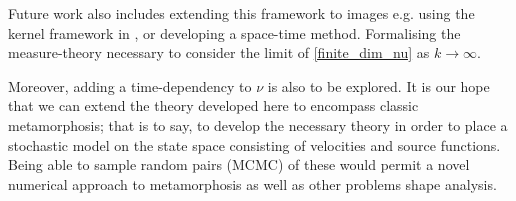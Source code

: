 \documentclass{article}
\begin{document}
Future work also includes extending this framework to images e.g. using the
kernel framework in \cite{richardson2016metamorphosis}, or developing a
space-time method. Formalising the measure-theory necessary to consider the
limit of \eqref{finite_dim_nu} as $k\rightarrow\infty$.

Moreover, adding a time-dependency to $\nu$ is also to be
explored. It is our hope that we can extend the theory developed here to
encompass classic metamorphosis; that is to say, to develop the necessary theory
in order to place a stochastic model on the state space consisting of
velocities and source functions. Being able to sample random pairs (MCMC) of these
would permit a novel numerical approach to metamorphosis as well as other
problems shape analysis.



\end{document}
